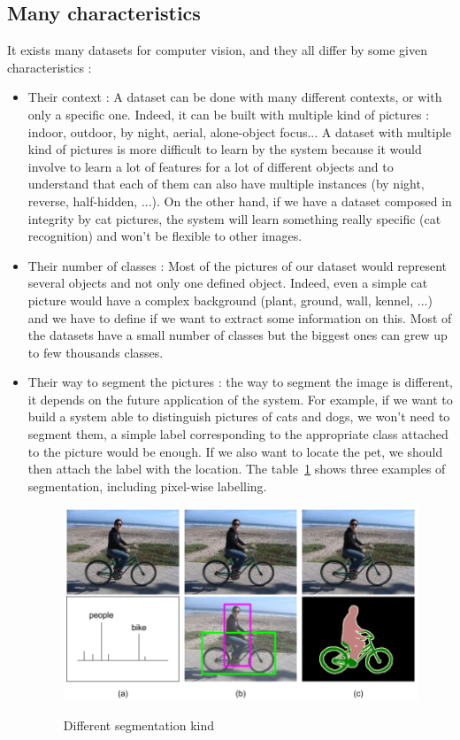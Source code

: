 \subsection{Many characteristics}
It exists many datasets for computer vision, and they all differ by some given characteristics :
\begin{itemize}
\item Their context : A dataset can be done with many different contexts, or with only a specific one. Indeed, it can be built with multiple kind of pictures : indoor, outdoor, by night, aerial, alone-object focus... A dataset with multiple kind of pictures is more difficult to learn by the system because it would involve to learn a lot of features for a lot of different objects and to understand that each of them can also have multiple instances (by night, reverse, half-hidden, ...). On the other hand, if we have a dataset composed in integrity by cat pictures, the system will learn something really specific (cat recognition) and won't be flexible to other images.
\item Their number of classes : Most of the pictures of our dataset would represent several objects and not only one defined object. Indeed, even a simple cat picture would have a complex background (plant, ground, wall, kennel, ...) and we have to define if we want to extract some information on this. Most of the datasets have a small number of classes but the biggest ones can grew up to few thousands classes.
\item Their way to segment the pictures : the way to segment the image is different, it depends on the future application of the system. For example, if we want to build a system able to distinguish pictures of cats and dogs, we won't need to segment them, a simple label corresponding to the appropriate class attached to the picture would be enough. If we also want to locate the pet, we should then attach the label with the location. The table~\ref{fig:part2:segmentation_comparison} shows three examples of segmentation, including pixel-wise labelling.

\begin{figure}[ht!]
  \includegraphics[width=\linewidth,center]{images/part2/segmentation_comparison.png}
  \caption{Different segmentation kind}\textbf{
  \label{fig:part2:segmentation_comparison}}
\end{figure}

\end{itemize}


